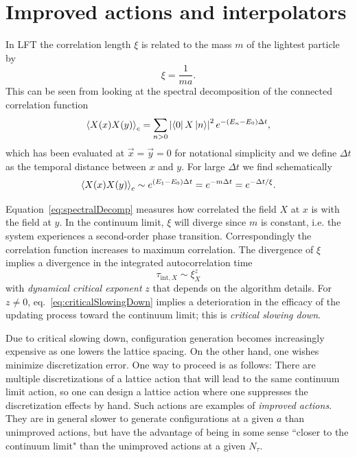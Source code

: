 \section{Improved actions and interpolators}

In LFT the correlation length $\xi$ is related to the mass $m$ of the lightest 
particle by
\begin{equation}
  \xi=\frac{1}{ma}.
\end{equation}
This can be seen from looking at the spectral decomposition of the
connected correlation function
\begin{equation}\label{eq:spectralDecomp}
  \ev{X(x)X(y)}_c=\sum_{n> 0} 
                   \left|\bra{0}X\ket{n}\right|^2
                    e^{-(E_n-E_0)\Delta t},
\end{equation}
which has been evaluated at $\vec{x}=\vec{y}=0$ for notational simplicity and
we define $\Delta t$ as the temporal distance between $x$ and $y$.
For large $\Delta t$ we find schematically
\begin{equation}
  \ev{X(x)X(y)}_c\sim e^{(E_1-E_0)\Delta t} =e^{-m\Delta t}=e^{-\Delta t/\xi}.
\end{equation}

Equation~\eqref{eq:spectralDecomp} measures how correlated the field 
$X$ at $x$ is with the field at $y$. In the continuum limit, $\xi$ will 
diverge since $m$ is constant, i.e. the system experiences a second-order 
phase transition. Correspondingly the correlation function increases to
maximum correlation. The divergence of $\xi$ implies a divergence in the
integrated autocorrelation time
\begin{equation}\label{eq:criticalSlowingDown}
  \tau_{\text{int}, X} \sim \xi_X^z
\end{equation}
with {\it dynamical critical exponent} $z$ that depends on the algorithm 
details. For $z\neq 0$, eq.~\eqref{eq:criticalSlowingDown} implies a
deterioration in the efficacy of the updating process toward the
continuum limit; this is {\it critical slowing down}.

Due to critical slowing down, configuration generation becomes increasingly
expensive as one lowers the lattice spacing.
On the other hand, one wishes minimize discretization error. One way to
proceed is as follows: There are multiple discretizations of a lattice action
that will lead to the same continuum limit action, so one can design a lattice
action where one suppresses the discretization effects by hand. Such actions
are examples of {\it improved actions}. They are in general slower to generate
configurations at a given $a$ than unimproved actions, but have the advantage
of being in some sense ``closer to the continuum limit" than the unimproved
actions at a given $N_\tau$.

